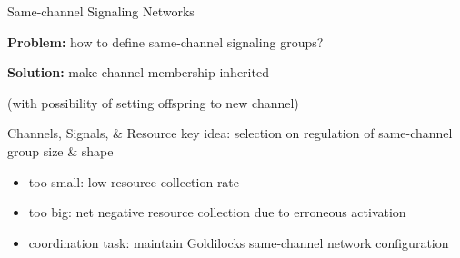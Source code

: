 \begin{frame}{Same-channel Signaling Networks}

\Large
\textbf{Problem:} how to define same-channel signaling groups?

\pause

\textbf{Solution:} make channel-membership inherited

\normalsize
(with possibility of setting offspring to new channel)

\end{frame}

%   
%
%   

\begin{frame}{Channels, Signals, \& Resource}
key idea: selection on regulation of same-channel group size \& shape
\pause
\begin{itemize}[<+->]
  \item too small: low resource-collection rate
  \item too big: net negative resource collection due to erroneous activation
  \item coordination task: maintain Goldilocks same-channel network configuration
\end{itemize}

\end{frame}

